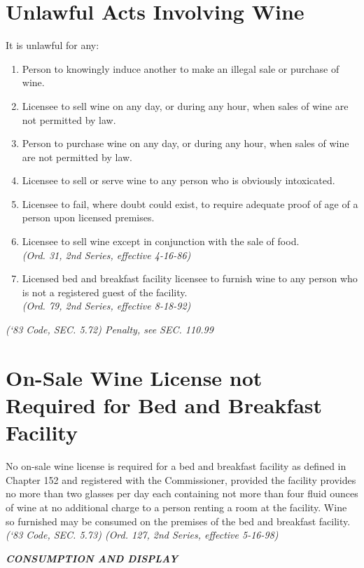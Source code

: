 \section{Unlawful Acts Involving Wine}
It is unlawful for any:
\begin{enumerate}[{\indent}A)]
    \item Person to knowingly induce another to make an illegal sale or purchase of wine.
    \item Licensee to sell wine on any day, or during any hour, when sales of wine are not permitted by law.
    \item Person to purchase wine on any day, or during any hour, when sales of wine are not permitted by law.
    \item Licensee to sell or serve wine to any person who is obviously intoxicated.
    \item Licensee to fail, where doubt could exist, to require adequate proof of age of a person upon licensed premises.
    \item Licensee to sell wine except in conjunction with the sale of food.\\
        \emph{(Ord. 31, 2nd Series, effective 4-16-86)}
    \item Licensed bed and breakfast facility licensee to furnish wine to any person who is not a registered guest of the facility.\\
        \emph{(Ord. 79, 2nd Series, effective 8-18-92)}
\end{enumerate}
\emph{(‘83 Code, SEC. 5.72)  Penalty, see SEC. 110.99}
\section{On-Sale Wine License not Required for Bed and Breakfast Facility}
No on-sale wine license is required for a bed and breakfast facility as defined in Chapter 152 and registered with the Commissioner, provided the facility provides no more than two glasses per day each containing not more than four fluid ounces of wine at no additional charge to a person renting a room at the facility.  Wine so furnished may be consumed on the premises of the bed and breakfast facility.\\
\emph{(‘83 Code, SEC. 5.73)  (Ord. 127, 2nd Series, effective 5-16-98)}

\begin{center}
    \emph{\textbf{\LARGE{CONSUMPTION AND DISPLAY}}}
\end{center}

